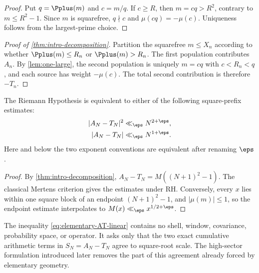 \begin{proof}
Put $q=\Pplus(m)$ and $c=m/q$.  If $c\ge R$, then $m=cq>R^2$, contrary to $m\le R^2-1$.  Since $m$ is squarefree, $q\nmid c$ and $\mu(cq)=-\mu(c)$.  Uniqueness follows from the largest-prime choice.
\end{proof}

\begin{proof}[Proof of \cref{thm:intro-decomposition}]
Partition the squarefree $m\le X_n$ according to whether $\Pplus(m)\le R_n$ or $\Pplus(m)>R_n$.  The first population contributes $A_n$.  By \cref{lem:one-large}, the second population is uniquely $m=cq$ with $c<R_n<q$, and each source has weight $-\mu(c)$.  The total second contribution is therefore $-T_n$.
\end{proof}

\begin{corollary}
\label{cor:elementary-AT-RH}
The Riemann Hypothesis is equivalent to either of the following square-prefix estimates:
\begin{align}
 |A_N-T_N|^2&\ll_\eps N^{2+\eps},
 \label{eq:elementary-AT-squared}\\
 |A_N-T_N|&\ll_\eps N^{1+\eps}.
 \label{eq:elementary-AT-linear}
\end{align}
Here and below the two exponent conventions are equivalent after renaming $\eps$.
\end{corollary}

\begin{proof}
By \cref{thm:intro-decomposition}, $A_N-T_N=M((N+1)^2-1)$.  The classical Mertens criterion gives the estimates under RH.  Conversely, every $x$ lies within one square block of an endpoint $(N+1)^2-1$, and $|\mu(m)|\le1$, so the endpoint estimate interpolates to $M(x)\ll_\eps x^{1/2+\eps}$.
\end{proof}

\begin{remark}
The inequality \cref{eq:elementary-AT-linear} contains no shell, window, covariance, probability space, or operator.  It asks only that the two exact cumulative arithmetic terms in $S_N=A_N-T_N$ agree to square-root scale.  The high-sector formulation introduced later removes the part of this agreement already forced by elementary geometry.
\end{remark}

